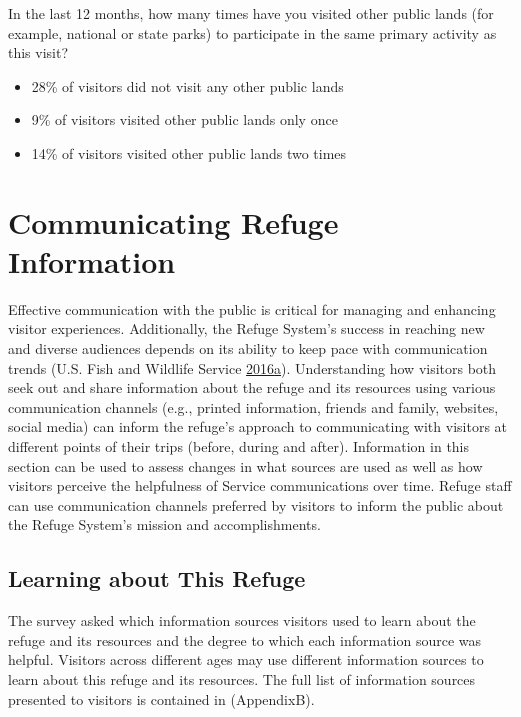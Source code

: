 \documentclass[]{book}
\providecommand{\tightlist}{%
  \setlength{\itemsep}{0pt}\setlength{\parskip}{0pt}}
\let\BeginKnitrBlock\begin \let\EndKnitrBlock\end
\begin{document}
In the last 12 months, how many times have you visited other public
lands (for example, national or state parks) to participate in the same
primary activity as this visit?

\begin{itemize}
\tightlist
\item
  28\% of visitors did not visit any other public lands
\item
  9\% of visitors visited other public lands only once
\item
  14\% of visitors visited other public lands two times
\end{itemize}

\chapter{Communicating Refuge Information}\label{comm}

\BeginKnitrBlock{preamble1}
Effective communication with the public is critical for managing and
enhancing visitor experiences. Additionally, the Refuge System's success
in reaching new and diverse audiences depends on its ability to keep
pace with communication trends (U.S. Fish and Wildlife Service
\protect\hyperlink{ref-USFWS2016a}{2016}\protect\hyperlink{ref-USFWS2016a}{a}).
Understanding how visitors both seek out and share information about the
refuge and its resources using various communication channels (e.g.,
printed information, friends and family, websites, social media) can
inform the refuge's approach to communicating with visitors at different
points of their trips (before, during and after). Information in this
section can be used to assess changes in what sources are used as well
as how visitors perceive the helpfulness of Service communications over
time. Refuge staff can use communication channels preferred by visitors
to inform the public about the Refuge System's mission and
accomplishments.
\EndKnitrBlock{preamble1}

\section{Learning about This Refuge}\label{learning-about-this-refuge}

The survey asked which information sources visitors used to learn about
the refuge and its resources and the degree to which each information
source was helpful. Visitors across different ages may use different
information sources to learn about this refuge and its resources. The
full list of information sources presented to visitors is contained in
(AppendixB).
\end{document}
